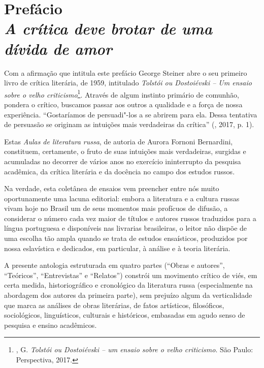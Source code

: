 \chapter*{Prefácio\\
\bigskip
\emph{A crítica deve brotar de uma dívida de amor}}




Com a afirmação que intitula este prefácio George Steiner abre o seu primeiro livro de crítica
literária, de 1959, intitulado \emph{Tolstói ou Dostoiévski -- Um ensaio
sobre o velho criticismo}\footnote{\scalebox{0.8}{STEINER}, G. \emph{Tolstói ou
  Dostoiévski -- um ensaio sobre o velho criticismo}. São Paulo:
  Perspectiva, 2017.}. Através de algum instinto primário de comunhão,
pondera o crítico, buscamos passar aos outros a qualidade e a força de
nossa experiência. ``Gostaríamos de persuadi"-los a se abrirem para ela.
Dessa tentativa de persuasão se originam as intuições mais verdadeiras
da crítica'' (\scalebox{0.8}{STEINER}, 2017, p. 1).

Estas \emph{Aulas de literatura russa}, de autoria de Aurora Fornoni
Bernardini, constituem, certamente, o fruto de suas intuições mais
verdadeiras, surgidas e acumuladas no decorrer de vários anos no
exercício ininterrupto da pesquisa acadêmica, da crítica literária e da
docência no campo dos estudos russos.

Na verdade, esta coletânea de ensaios vem preencher entre nós muito
oportunamente uma lacuna editorial: embora a literatura e a cultura
russas vivam hoje no Brasil um de seus momentos mais profícuos de
difusão, a considerar o número cada vez maior de títulos e
autores russos traduzidos para a língua portuguesa e disponíveis nas
livrarias brasileiras, o leitor não dispõe de uma escolha
tão ampla quando se trata de estudos ensaísticos,
produzidos por nossa eslavística e dedicados, em particular, à análise e
à teoria literária.

A presente antologia estruturada em quatro partes (``Obras e
autores'', ``Teóricos'', ``Entrevistas'' e ``Relatos'') constrói um movimento crítico de viés,
em certa medida, historiográfico e cronológico da literatura russa
(especialmente na abordagem dos autores da primeira parte),
sem prejuízo algum da verticalidade que marca as análises de obras literárias, de fatos artísticos, filosóficos,
sociológicos, linguísticos, culturais e históricos, embasadas em agudo
senso de pesquisa e ensino acadêmicos.

